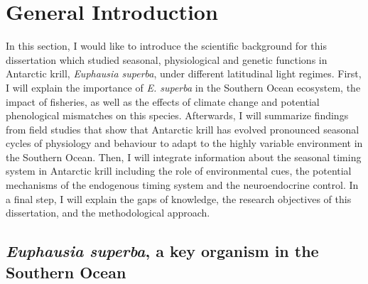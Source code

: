 \chapter{General Introduction} %
\label{Intro} %

\newcommand{\keyword}[1]{\textbf{#1}}
\newcommand{\tabhead}[1]{\textbf{#1}}
\newcommand{\code}[1]{\texttt{#1}}
\newcommand{\file}[1]{\texttt{\bfseries#1}}
\newcommand{\option}[1]{\texttt{\itshape#1}}
\newcommand{\krilllatin}{\textit{Euphausia superba}}
\newcommand{\krilllatinshort}{\textit{E. superba}}

In this section, I would like to introduce the scientific background for this
dissertation which studied seasonal, physiological and genetic functions in
Antarctic krill, \textit{Euphausia superba}, under different latitudinal light
regimes. First, I will explain the importance of \textit{E. superba} in the
Southern Ocean ecosystem, the impact of fisheries, as well as the effects of
climate change and potential phenological mismatches on this species.
Afterwards, I will summarize findings from field studies that show that
Antarctic krill has evolved pronounced seasonal cycles of physiology and
behaviour to adapt to the highly variable environment in the Southern Ocean.
Then, I will integrate information about the seasonal timing system in
Antarctic krill including the role of environmental cues, the potential
mechanisms of the endogenous timing system and the neuroendocrine control. In a
final step, I will explain the gaps of knowledge, the research objectives of
this dissertation, and the methodological approach.

\section{\textit{Euphausia superba}, a key organism in the Southern Ocean}

